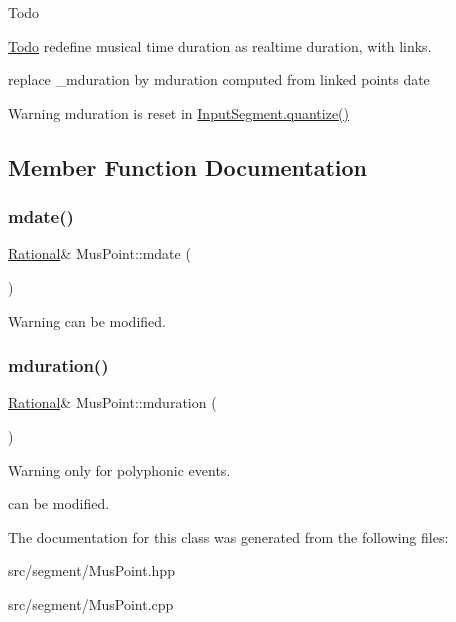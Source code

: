 \begin{DoxyRefDesc}{Todo}
\item[\mbox{\hyperlink{todo__todo000026}{Todo}}]redefine musical time duration as realtime duration, with links. 

replace \+\_\+mduration by mduration computed from linked point\textquotesingle{}s date \end{DoxyRefDesc}
\begin{DoxyWarning}{Warning}
mduration is reset in \mbox{\hyperlink{group__segment_ga42c65e4989c84fbce42115d8e7813f8e}{Input\+Segment.\+quantize()}} 
\end{DoxyWarning}


\subsection{Member Function Documentation}
\mbox{\label{classMusPoint_a88d1f2efdc00dc80985bbe76356099b2}} 
\subsubsection{\texorpdfstring{mdate()}{mdate()}}
{\footnotesize\ttfamily \mbox{\hyperlink{classRational}{Rational}}\& Mus\+Point\+::mdate (\begin{DoxyParamCaption}{ }\end{DoxyParamCaption})\hspace{0.3cm}{\ttfamily [inline]}}

\begin{DoxyWarning}{Warning}
can be modified. 
\end{DoxyWarning}
\mbox{\label{classMusPoint_a2f89f6b4930b75e633d8b3cd3e461aa2}} 
\subsubsection{\texorpdfstring{mduration()}{mduration()}}
{\footnotesize\ttfamily \mbox{\hyperlink{classRational}{Rational}}\& Mus\+Point\+::mduration (\begin{DoxyParamCaption}{ }\end{DoxyParamCaption})\hspace{0.3cm}{\ttfamily [inline]}}

\begin{DoxyWarning}{Warning}
only for polyphonic events. 

can be modified. 
\end{DoxyWarning}


The documentation for this class was generated from the following files\+:\begin{DoxyCompactItemize}
\item 
src/segment/Mus\+Point.\+hpp\item 
src/segment/Mus\+Point.\+cpp\end{DoxyCompactItemize}
